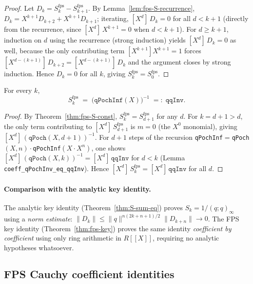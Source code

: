 \begin{proof}\leanok
Let $D_k = S^{\mathrm{fps}}_k - S^{\mathrm{fps}}_{k+1}$.
By Lemma~\ref{lem:fps-S-recurrence}, $D_k = X^{k+1} D_{k+2} + X^{k+1} D_{k+1}$;
iterating, $[X^d]\,D_k = 0$ for all $d < k+1$ (directly from the recurrence,
since $[X^d]\,X^{k+1} = 0$ when $d < k+1$). For $d \ge k+1$, induction on $d$
using the recurrence (strong induction) yields $[X^d]\,D_k = 0$ as well,
because the only contributing term $[X^{k+1}]X^{k+1} = 1$ forces
$[X^{d-(k+1)}]\,D_{k+2} = [X^{d-(k+1)}]\,D_k$ and the argument closes
by strong induction. Hence $D_k = 0$ for all $k$, giving $S^{\mathrm{fps}}_k = S^{\mathrm{fps}}_0$.
\end{proof}

\begin{theorem}\label{thm:fps-key}\leanok{}
For every $k$,
\[
  S^{\mathrm{fps}}_k
  \;=\; \bigl(\texttt{qPochInf}(X)\bigr)^{-1}
  \;=:\; \texttt{qqInv}.
\]
\end{theorem}

\begin{proof}\leanok
By Theorem~\ref{thm:fps-S-const}, $S^{\mathrm{fps}}_k = S^{\mathrm{fps}}_{d+1}$ for any $d$.
For $k = d+1 > d$, the only term contributing to $[X^d]\,S^{\mathrm{fps}}_{d+1}$
is $m=0$ (the $X^{0}$ monomial), giving $[X^d]\,(\texttt{qPoch}(X,d+1))^{-1}$.
For $d+1$ steps of the recursion \texttt{qPochInf}$= $\texttt{qPoch}$(X,n)\cdot$\texttt{qPochInf}$(X \cdot X^n)$,
one shows $[X^d]\,(\texttt{qPoch}(X,k))^{-1} = [X^d]\,\texttt{qqInv}$ for $d < k$
(Lemma \texttt{coeff\_qPochInv\_eq\_qqInv}). Hence $[X^d]\,S^{\mathrm{fps}}_k = [X^d]\,\texttt{qqInv}$ for all $d$.
\end{proof}

\paragraph{Comparison with the analytic key identity.}
The analytic key identity (Theorem~\ref{thm:S-sum-eq}) proves $S_k = 1/(q;q)_\infty$
using a \emph{norm estimate}: $\|D_k\| \le \|q\|^{n(2k+n+1)/2} \|D_{k+n}\| \to 0$.
The FPS key identity (Theorem~\ref{thm:fps-key}) proves the same identity
\emph{coefficient by coefficient} using only ring arithmetic in $R[\![ X ]\!]$,
requiring no analytic hypotheses whatsoever.

\subsection{FPS Cauchy coefficient identities}
\label{subsec:fps-cauchy}

